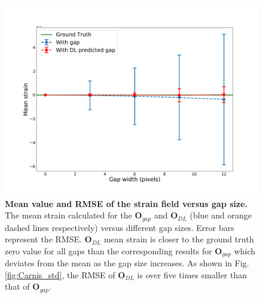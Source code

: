 
\begin{figure}[H]
    \centering
    \includegraphics[width=\textwidth]{figures/Inpainting/avg_strain_comparison-1.pdf}
    \caption{\textbf{Mean value and RMSE of the strain field versus gap size.} The mean strain calculated for the 
    $\mathbf{O}_{gap}$ and $\mathbf{O}_{DL}$ (blue and orange dashed lines respectively) versus different 
    gap sizes. Error bars represent the RMSE. $\mathbf{O}_{DL}$ mean strain is closer to the ground truth zero value 
    for all gaps than the corresponding results for $\mathbf{O}_{gap}$ which deviates from the mean as the gap size increases.
    As shown in Fig. \ref{fig:Carnis_std}, the RMSE of $\mathbf{O}_{DL}$ is over five times smaller than that of
     $\mathbf{O}_{gap}$.}
    \label{fig:Carnis_avg}
\end{figure}

